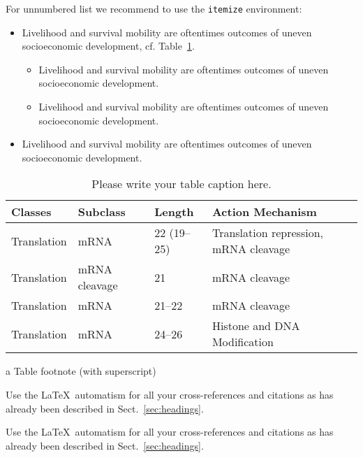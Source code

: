 \documentclass{aip-book}
\theoremstyle{definition}
\begin{document}
For unnumbered list we recommend to use the \verb+itemize+ environment:
\begin{itemize}
  \item Livelihood and survival mobility are oftentimes outcomes of uneven socioeconomic development, cf. Table~\ref{tab:mRNA}.
  \begin{itemize}
      \item Livelihood and survival mobility are oftentimes outcomes of uneven socioeconomic development.
      \item Livelihood and survival mobility are oftentimes outcomes of uneven socioeconomic development.
  \end{itemize}
  \item Livelihood and survival mobility are oftentimes outcomes of uneven socioeconomic development.
\end{itemize}

\begin{table}
\centering
\begin{threeparttable}[t]
\caption{Please write your table caption here.}\label{tab:mRNA}
\begin{tabular}{l>{\raggedright}p{1.5cm}l>{\raggedright\arraybackslash}p{4cm}}
  \toprule
  Classes & Subclass & Length & Action Mechanism \\
  \midrule
  Translation & mRNA\tnote{a} & 22 (19--25) & Translation repression, mRNA cleavage \\
  Translation & mRNA cleavage & 21 & mRNA cleavage \\
  Translation & mRNA & 21--22 & mRNA cleavage \\
  Translation & mRNA & 24--26 & Histone and DNA Modification \\
  \bottomrule
\end{tabular}
\begin{tablenotes}
  \item[a] Table footnote (with superscript)
\end{tablenotes}
\end{threeparttable}
\end{table}

Use the \LaTeX\ automatism for all your cross-references and citations as has already been described in Sect.~\ref{sec:headings}.

Use the \LaTeX\ automatism for all your cross-references and citations as has already been described in Sect.~\ref{sec:headings}.
\end{document}
